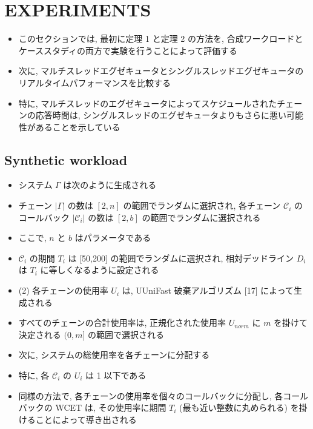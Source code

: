 
\section{EXPERIMENTS}
\label{sec: experiments}


\begin{frame}{}
    \begin{itemize}
        \item このセクションでは, 最初に定理 1 と定理 2 の方法を, 合成ワークロードとケーススタディの両方で実験を行うことによって評価する
\item 次に, マルチスレッドエグゼキュータとシングルスレッドエグゼキュータのリアルタイムパフォーマンスを比較する
\item 特に, マルチスレッドのエグゼキュータによってスケジュールされたチェーンの応答時間は, シングルスレッドのエグゼキュータよりもさらに悪い可能性があることを示している
    \end{itemize}
\end{frame}


\subsection{Synthetic workload}
\label{ssec: synthetic workload}

\begin{frame}{}
    \begin{itemize}
        \item システム $\Gamma$ は次のように生成される
\item チェーン $|\Gamma|$ の数は $[2, n]$ の範囲でランダムに選択され, 各チェーン $\mathcal{C}_{i}$ のコールバック $\left|\mathcal{C}_{i}\right|$ の数は $[2, b]$ の範囲でランダムに選択される
\item ここで, $n$ と $b$ はパラメータである
\item $\mathcal{C}_{i}$ の期間 $T_{i}$ は [50,200] の範囲でランダムに選択され, 相対デッドライン $D_{i}$ は $T_{i}$ に等しくなるように設定される
\item (2) 各チェーンの使用率 $U_{i}$ は, UUniFast 破棄アルゴリズム [17] によって生成される
\item すべてのチェーンの合計使用率は, 正規化された使用率 $U_{n o r m}$ に $m$ を掛けて決定される $(0, m]$ の範囲で選択される
\item 次に, システムの総使用率を各チェーンに分配する
\item 特に, 各 $\mathcal{C}_{i}$ の $U_{i}$ は 1 以下である
\item 同様の方法で, 各チェーンの使用率を個々のコールバックに分配し, 各コールバックの WCET は, その使用率に期間 $T_{i}$ (最も近い整数に丸められる) を掛けることによって導き出される
    \end{itemize}
\end{frame}


